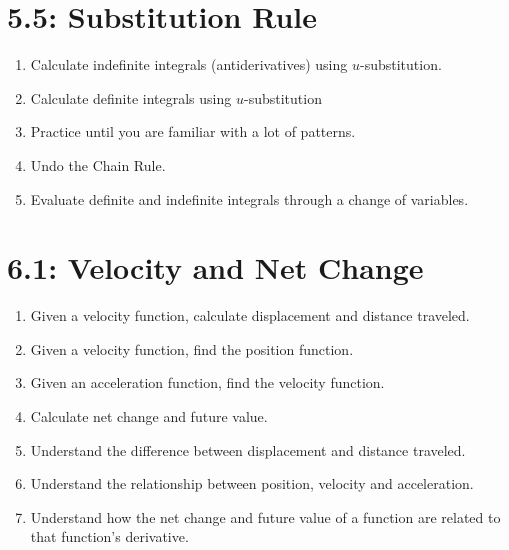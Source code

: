 \section*{5.5: Substitution Rule}
\begin{enumerate}
	\item Calculate indefinite integrals (antiderivatives) using $u$-substitution.
	\item Calculate definite integrals using $u$-substitution
	\item Practice until you are familiar with a lot of patterns.
	\item Undo the Chain Rule.
	\item Evaluate definite and indefinite integrals through a change of variables.
\end{enumerate}

\section*{6.1: Velocity and Net Change}
\begin{enumerate}
	\item Given a velocity function, calculate displacement and distance traveled.
	\item Given a velocity function, find the position function.
	\item Given an acceleration function, find the velocity function.
	\item Calculate net change and future value.
	\item Understand the difference between displacement and distance traveled.
	\item Understand the relationship between position, velocity and acceleration.
	\item Understand how the net change and future value of a function are related to that function's derivative.
\end{enumerate}

